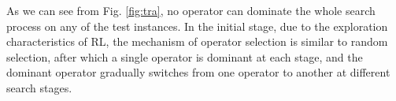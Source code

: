 \documentclass[journal]{IEEEtran}
\begin{document}
As we can see from Fig. \ref{fig:tra}, no operator can dominate the whole search process on any of the test instances. In the initial stage, due to the exploration characteristics of RL, the mechanism of operator selection is similar to random selection, after which a single operator is dominant at each stage, and the dominant operator gradually switches from one operator to another at different search stages.


\begin{figure}[t]
  \centering
  \hfil
  \hfil
  \hfil
  \hfil

\end{figure}
\end{document}
